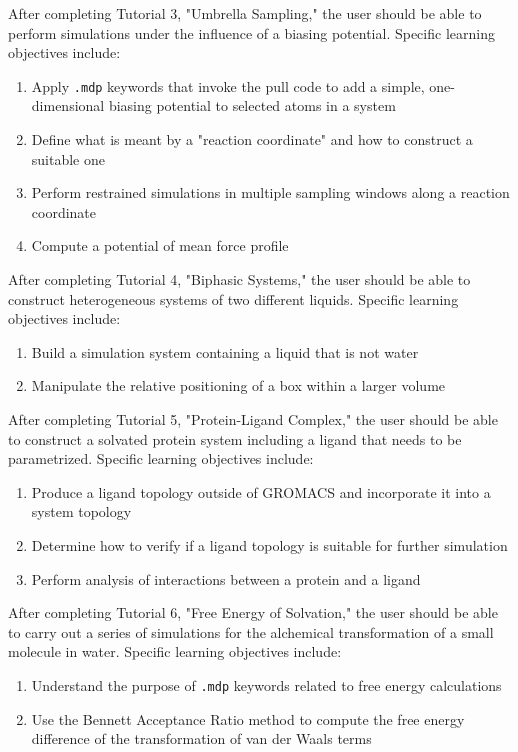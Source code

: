 \documentclass[9pt,tutorial,pubversion]{livecoms}
\begin{document}
After completing Tutorial 3, "Umbrella Sampling," the user should be able to perform simulations under the influence of a biasing potential. Specific learning objectives include:
\begin{enumerate}
	\item Apply \texttt{.mdp} keywords that invoke the pull code to add a simple, one-dimensional biasing potential to selected atoms in a system
	\item Define what is meant by a "reaction coordinate" and how to construct a suitable one
	\item Perform restrained simulations in multiple sampling windows along a reaction coordinate
	\item Compute a potential of mean force profile
\end{enumerate}

After completing Tutorial 4, "Biphasic Systems," the user should be able to construct heterogeneous systems of two different liquids. Specific learning objectives include:
\begin{enumerate}
	\item Build a simulation system containing a liquid that is not water
	\item Manipulate the relative positioning of a box within a larger volume
\end{enumerate}

After completing Tutorial 5, "Protein-Ligand Complex," the user should be able to construct a solvated protein system including a ligand that needs to be parametrized. Specific learning objectives include:
\begin{enumerate}
	\item Produce a ligand topology outside of GROMACS and incorporate it into a system topology
	\item Determine how to verify if a ligand topology is suitable for further simulation
	\item Perform analysis of interactions between a protein and a ligand
\end{enumerate}

After completing Tutorial 6, "Free Energy of Solvation," the user should be able to carry out a series of simulations for the alchemical transformation of a small molecule in water. Specific learning objectives include:
\begin{enumerate}
	\item Understand the purpose of \texttt{.mdp} keywords related to free energy calculations
	\item Use the Bennett Acceptance Ratio method to compute the free energy difference of the transformation of van der Waals terms
\end{enumerate}
\end{document}
